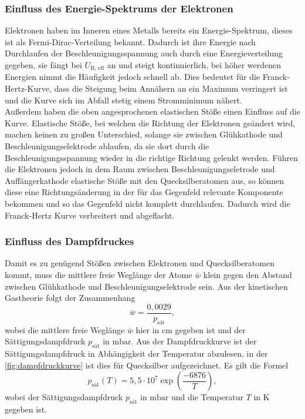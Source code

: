     \subsubsection{Einfluss des Energie-Spektrums der Elektronen}

        Elektronen haben im Inneren eines Metalls bereits ein Energie-Spektrum, dieses ist als Fermi-Dirac-Verteilung bekannt. Dadurch ist ihre Energie nach 
        Durchlaufen der Beschleunigungsspannung auch durch eine Energieverteilung gegeben, sie fängt bei $U_{\text{B, eff}}$ an und steigt kontinuierlich, bei 
        höher werdenen Energien nimmt die Häufigkeit jedoch schnell ab. Dies bedeutet für die Franck-Hertz-Kurve, dass die Steigung beim Annähern an ein Maximum 
        verringert ist und die Kurve sich im Abfall stetig einem Stromminimum nähert. \\

        \noindent Außerdem haben die oben angesprochenen elastischen Stöße einen Einfluss auf die Kurve. Elastische Stöße, bei welchen die Richtung der Elektronen 
        geändert wird, machen keinen zu großen Unterschied, solange sie zwischen Glühkathode und Beschleunigungselektrode ablaufen, da sie dort durch die 
        Beschleunigungsspannung wieder in die richtige Richtung gelenkt werden. Führen die Elektronen jedoch in dem Raum zwischen Beschleunigungseletrode und 
        Auffängerkathode elastische Stöße mit den Quecksilberatomen aus, so können diese eine Richtungsänderung in der für das Gegenfeld relevante Komponente 
        bekommen und so das Gegenfeld nicht komplett durchlaufen. Dadurch wird die Franck-Hertz Kurve verbreitert und abgeflacht. 

    \subsubsection{Einfluss des Dampfdruckes}

        Damit es zu genügend Stößen zwischen Elektronen und Quecksilberatomen kommt, muss die mittlere freie Weglänge der Atome $\bar{w}$ klein gegen den Abstand zwischen 
        Glühkathode und Beschleunigungselektrode sein. Aus der kinetischen Gastheorie folgt der Zusammenhang
        \begin{equation}\label{eqn:w_bar}
            \bar{w} = \frac{0,0029}{p_{\text{sät}}}, 
        \end{equation}
        wobei die mittlere freie Weglänge $\bar{w}$ hier in $\si{\centi\metre}$ gegeben ist und der Sättigungsdampfdruck $p_{\text{sät}}$ in $\si{\milli\bar}$. 
        Aus der Dampfdruckkurve ist der Sättigungsdampfdruck in Abhängigkeit der Temperatur abzulesen, in der \autoref{fig:dampfdruckkurve} ist dies für 
        Quecksilber aufgezeichnet. Es gilt die Formel 
        \begin{equation}\label{eqn:p_sat}
            p_{\text{sät}}(T) = 5,5 \cdot 10^7 \exp(\frac{-6876}{T}), 
        \end{equation}
        wobei der Sättigungsdampfdruck $p_{\text{sät}}$ in $\si{\milli\bar}$ und die Temperatur $T$ in $\si{\kelvin}$ gegeben ist. 

